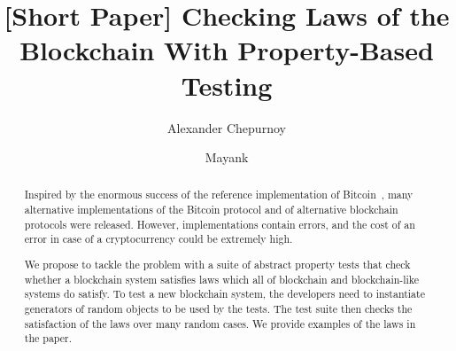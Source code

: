 \documentclass[]{llncs}   %
\begin{document}
\title{[Short Paper] Checking Laws of the Blockchain With Property-Based Testing}

\author{Alexander Chepurnoy \and Mayank}
\maketitle

\begin{abstract}
Inspired by the enormous success of the reference implementation of Bitcoin~\cite{Nakamoto2008}, many alternative implementations of the Bitcoin protocol and of alternative blockchain protocols were released. However, implementations contain errors, and the cost of an error in case of a cryptocurrency could be extremely high. 

We propose to tackle the problem with a suite of abstract property tests that check whether a blockchain system satisfies laws which all of blockchain and blockchain-like systems do satisfy. To test a new blockchain system, the developers need to instantiate generators of random objects to be used by the tests. The test suite then checks the satisfaction of the laws over many random cases. We provide examples of the laws in the paper.
\end{abstract}








%






%
\end{document}
